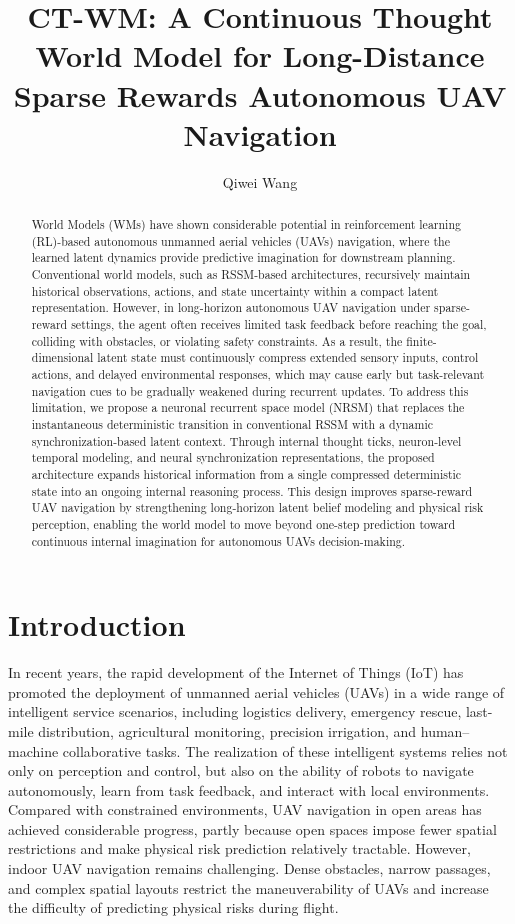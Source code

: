 \documentclass{article}
\title{CT-WM: A Continuous Thought World Model for Long-Distance Sparse Rewards Autonomous UAV Navigation}
\author{
Qiwei Wang
}
\begin{document}
\maketitle

\begin{abstract}
World Models (WMs) have shown considerable potential in reinforcement learning (RL)-based autonomous unmanned aerial vehicles (UAVs) navigation, where the learned latent dynamics provide predictive imagination for downstream planning. Conventional world models, such as RSSM-based architectures, recursively maintain historical observations, actions, and state uncertainty within a compact latent representation. However, in long-horizon autonomous UAV navigation under sparse-reward settings, the agent often receives limited task feedback before reaching the goal, colliding with obstacles, or violating safety constraints. As a result, the finite-dimensional latent state must continuously compress extended sensory inputs, control actions, and delayed environmental responses, which may cause early but task-relevant navigation cues to be gradually weakened during recurrent updates. To address this limitation, we propose a neuronal recurrent space model (NRSM) that replaces the instantaneous deterministic transition in conventional RSSM with a dynamic synchronization-based latent context. Through internal thought ticks, neuron-level temporal modeling, and neural synchronization representations, the proposed architecture expands historical information from a single compressed deterministic state into an ongoing internal reasoning process. This design improves sparse-reward UAV navigation by strengthening long-horizon latent belief modeling and physical risk perception, enabling the world model to move beyond one-step prediction toward continuous internal imagination for autonomous UAVs decision-making.
\end{abstract}

\section{Introduction}

In recent years, the rapid development of the Internet of Things (IoT) has promoted the deployment of unmanned aerial vehicles (UAVs) in a wide range of intelligent service scenarios, including logistics delivery, emergency rescue, last-mile distribution, agricultural monitoring, precision irrigation, and human--machine collaborative tasks. The realization of these intelligent systems relies not only on perception and control, but also on the ability of robots to navigate autonomously, learn from task feedback, and interact with local environments. Compared with constrained environments, UAV navigation in open areas has achieved considerable progress, partly because open spaces impose fewer spatial restrictions and make physical risk prediction relatively tractable. However, indoor UAV navigation remains challenging. Dense obstacles, narrow passages, and complex spatial layouts restrict the maneuverability of UAVs and increase the difficulty of predicting physical risks during flight.
\end{document}
